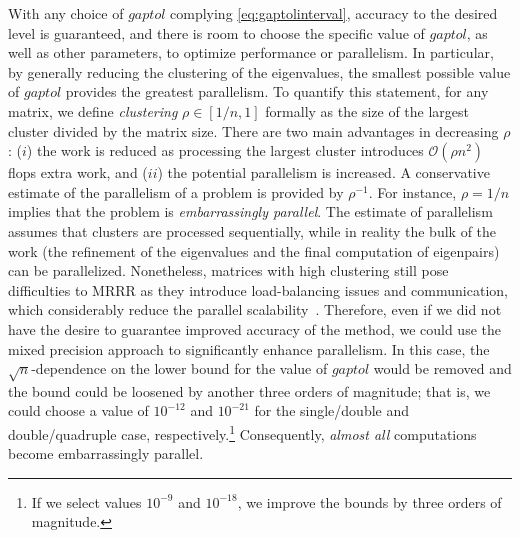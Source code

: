 \documentclass[final]{siamltex}
\newcommand\order[1]{\mathcal{O}(#1)}
\begin{document}
 With any choice of $gaptol$ complying \eqref{eq:gaptolinterval}, accuracy
 to the desired level is guaranteed, and there is room to choose the specific
 value of $gaptol$, as well as other parameters, to optimize performance or
 parallelism. In particular, by generally reducing the clustering of the
 eigenvalues, the smallest possible value of $gaptol$ provides the greatest parallelism.
 To quantify this statement, for any matrix, we
 define {\it clustering} $\rho \in [1/n, 1]$ formally as the size of the
 largest cluster divided by the matrix size. There are two main advantages
 in decreasing $\rho$: ($i$) the work is reduced as processing the
 largest cluster introduces $\order{\rho n^2}$ 
 flops extra work, and ($ii$) the potential parallelism is increased. A conservative
 estimate of the parallelism of a problem is provided by $\rho^{-1}$. For instance, $\rho
 = 1/n$ implies that the problem is {\it embarrassingly parallel}. The
 estimate of parallelism assumes that clusters are processed sequentially,
 while in reality the bulk of the work (the refinement of the eigenvalues and
 the final computation of eigenpairs) can be
 parallelized. Nonetheless, matrices with high clustering still pose
 difficulties to MRRR as they introduce load-balancing issues and
 communication, which considerably reduce the parallel
 scalability~\cite{Vomel:2010:ScaLAPACKsMRRR,VoemelRefinedTree2007tr,mydiss}. 
 Therefore, even if we did not have the desire to guarantee improved accuracy of
 the method, we could use the mixed precision approach to significantly
 enhance parallelism. In this case, the $\sqrt{n}$-dependence on the lower
 bound for the value of $gaptol$ would be removed and the bound could be
 loosened by another three orders of magnitude; that is, we could choose a value of
 $10^{-12}$ and $10^{-21}$ for the single/double and double/quadruple case,
 respectively.\footnote{If we select values $10^{-9}$ and $10^{-18}$, we improve the bounds by three orders of magnitude.} Consequently, {\it almost
 all} computations become embarrassingly parallel. 
\end{document}
